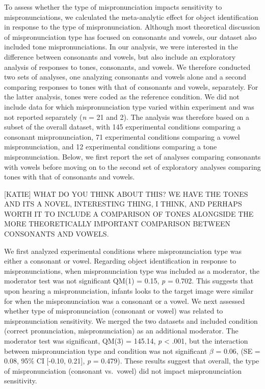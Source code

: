 \documentclass[man]{apa6}
\theoremstyle{definition}
\theoremstyle{definition}
\theoremstyle{definition}
\theoremstyle{remark}
\begin{document}
To assess whether the type of mispronunciation impacts sensitivity to
mispronunciations, we calculated the meta-analytic effect for object
identification in response to the type of mispronunciation. Although
most theoretical discussion of mispronunciation type has focused on
consonants and vowels, our dataset also included tone mispronunciations.
In our analysis, we were interested in the difference between consonants
and vowels, but also include an exploratory analysis of responses to
tones, consonants, and vowels. We therefore conducted two sets of
analyses, one analyzing consonants and vowels alone and a second
comparing responses to tones with that of consonants and vowels,
separately. For the latter analysis, tones were coded as the reference
condition. We did not include data for which mispronunciation type
varied within experiment and was not reported separately (\emph{n} = 21
and 2). The analysis was therefore based on a subset of the overall
dataset, with 145 experimental conditions comparing a consonant
mispronunciation, 71 experimental conditions comparing a vowel
mispronunciation, and 12 experimental conditions comparing a tone
mispronunciation. Below, we first report the set of analyses comparing
consonants with vowels before moving on to the second set of exploratory
analyses comparing tones with that of consonants and vowels.

{[}KATIE{]} WHAT DO YOU THINK ABOUT THIS? WE HAVE THE TONES AND ITS A
NOVEL, INTERESTING THING, I THINK, AND PERHAPS WORTH IT TO INCLUDE A
COMPARISON OF TONES ALONGSIDE THE MORE THEORETICALLY IMPORTANT
COMPARISON BETWEEN CONSONANTS AND VOWELS.

We first analyzed experimental conditions where mispronunciation type
was either a consonant or vowel. Regarding object identification in
response to mispronunciations, when mispronunciation type was included
as a moderator, the moderator test was not significant QM(1) = 0.15,
\emph{p} = 0.702. This suggests that upon hearing a mispronunciation,
infants looks to the target image were similar for when the
mispronunciation was a consonant or a vowel. We next assessed whether
type of mispronunciation (consonant or vowel) was related to
mispronunciation sensitivity. We merged the two datasets and included
condition (correct pronunciation, mispronunciation) as an additional
moderator. The moderator test was significant, QM(3) = 145.14, \emph{p}
\textless{} .001, but the interaction between mispronunciation type and
condition was not significant \(\beta\) = 0.06, (SE = 0.08, 95\% CI
{[}-0.10, 0.21{]}, \emph{p} = 0.479). These results suggest that
overall, the type of mispronunciation (consonant vs.~vowel) did not
impact mispronunciation sensitivity.
\end{document}
